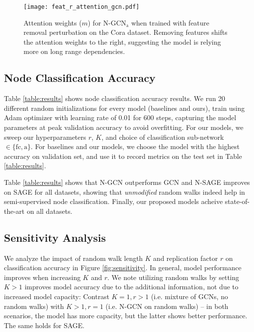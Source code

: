 \begin{figure*}[t]
	\centering
	\texttt{[image: feat\_r\_attention\_gcn.pdf]}
\caption{
	Attention weights ($m$) for $\textrm{N-GCN}_\textrm{a}$ 
when trained with feature removal perturbation on the Cora dataset. Removing features shifts the attention weights to the right, suggesting the model is relying more on long range dependencies.
	}
	\label{fig:attentionfeatremoval}
\end{figure*}


\subsection{Node Classification Accuracy}
Table \ref{table:results} shows node classification accuracy results.
We run 20 different random initializations for every model (baselines and ours), train using Adam optimizer \citep{adam} with learning rate of 0.01 for 600 steps, capturing the model parameters at peak validation accuracy to avoid overfitting.
For our models, we sweep our hyperparameters $r$, $K$, and choice of classification sub-network $\in \{\textrm{fc}, \textrm{a}\}$. For baselines and our models, we choose the model with the highest accuracy on validation set, and use it to record metrics on the test set in Table \ref{table:results}.

Table \ref{table:results} shows that N-GCN outperforms GCN \citep{kipf} and N-SAGE improves on SAGE for all datasets, showing that \textit{unmodified} random walks indeed help in semi-supervised node classification. Finally, our proposed models acheive state-of-the-art on all datasets.


\subsection{Sensitivity Analysis}
We analyze the impact of random walk length $K$ and replication factor $r$ on classification accuracy in Figure \ref{fig:sensitivity}. In general, model performance improves when increasing $K$ and $r$. We note utilizing random walks by setting $K>1$ improves model accuracy due to the additional information, not due to increased model capacity: Contrast $K=1, r>1$ (i.e. mixture of GCNs, no random walks) with $K>1, r=1$ (i.e. N-GCN on random walks) -- in both scenarios, the model has more capacity, but the latter shows better performance. The same holds for SAGE.


